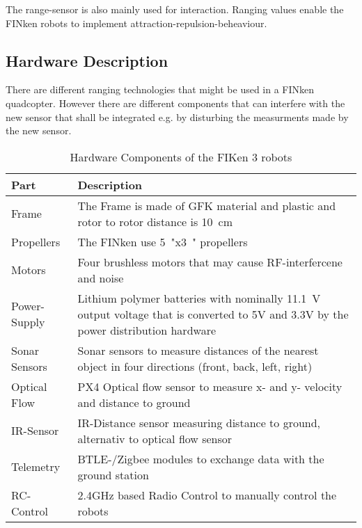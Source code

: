 The range-sensor is also mainly used for interaction.
Ranging values enable the FINken robots to implement attraction-repulsion-beheaviour.

\subsection{Hardware Description}
There are different ranging technologies that might be used in a FINken quadcopter.
However there are different components that can interfere with the new sensor that shall be integrated e.g. by disturbing the measurments made by the new sensor.

\begin{table}[H]
	\begin{tabularx}{\columnwidth}{l | X}
	Part & Description \\ \hline
	Frame & The Frame is made of GFK material and plastic and rotor to rotor distance is \SI{10}{\centi\metre} \\
	Propellers & The FINken use \SI{5}{"}x\SI{3}{"} propellers \\
	Motors & Four brushless motors that may cause RF-interfercene and noise \\
	Power-Supply & Lithium polymer batteries with nominally \SI{11.1}{\volt} output voltage that is converted to 5V and 3.3V by the power distribution hardware \\
	Sonar Sensors & Sonar sensors to measure distances of the nearest object in four directions (front, back, left, right) \\
	Optical Flow & PX4 Optical flow sensor to measure x- and y- velocity and distance to ground \\
	IR-Sensor & IR-Distance sensor measuring distance to ground, alternativ to optical flow sensor \\
	Telemetry & BTLE-/Zigbee modules to exchange data with the ground station \\
	RC-Control &  2.4GHz based Radio Control to manually control the robots \\
	\end{tabularx}
	\caption{Hardware Components of the FIKen 3 robots}
\end{table}

